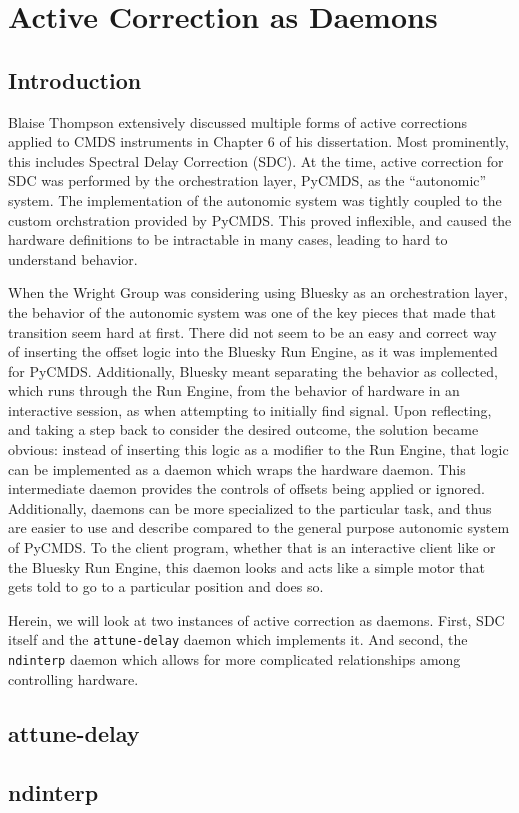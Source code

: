 \chapter{Active Correction as Daemons} \label{cha:opa400}

\clearpage

\section{Introduction}  %

Blaise Thompson extensively discussed multiple forms of active corrections applied to CMDS instruments in Chapter 6 of his dissertation\cite{ThompsonBlaiseJonathan2018a}.
Most prominently, this includes Spectral Delay Correction (SDC).
At the time, active correction for SDC was performed by the orchestration layer, PyCMDS, as the ``autonomic'' system.
The implementation of the autonomic system was tightly coupled to the custom orchstration provided by PyCMDS.
This proved inflexible, and caused the hardware definitions to be intractable in many cases, leading to hard to understand behavior.

When the Wright Group was considering using Bluesky as an orchestration layer, the behavior of the autonomic system was one of the key pieces that made that transition seem hard at first.
There did not seem to be an easy and correct way of inserting the offset logic into the Bluesky Run Engine, as it was implemented for PyCMDS.
Additionally, Bluesky meant separating the behavior as collected, which runs through the Run Engine, from the behavior of hardware in an interactive session, as when attempting to initially find signal.
Upon reflecting, and taking a step back to consider the desired outcome, the solution became obvious: instead of inserting this logic as a modifier to the Run Engine, that logic can be implemented as a daemon which wraps the hardware daemon.
This intermediate daemon provides the controls of offsets being applied or ignored.
Additionally, daemons can be more specialized to the particular task, and thus are easier to use and describe compared to the general purpose autonomic system of PyCMDS.
To the client program, whether that is an interactive client like \yaqcqtpy{} or the Bluesky Run Engine, this daemon looks and acts like a simple motor that gets told to go to a particular position and does so.

Herein, we will look at two instances of active correction as daemons.
First, SDC itself and the \texttt{attune-delay} daemon which implements it.
And second, the \texttt{ndinterp} daemon which allows for more complicated relationships among controlling hardware.

\clearpage

\section{attune-delay}  %

\clearpage

\section{ndinterp}  %

\clearpage
